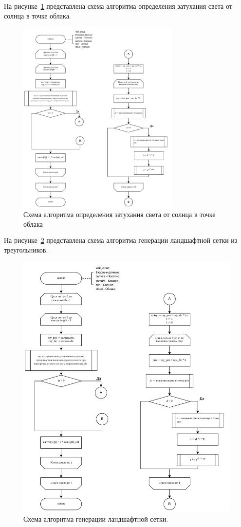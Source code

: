 \clearpage
На рисунке~\ref{fig:cloud_fc1} представлена схема алгоритма определения затухания света от солнца в точке облака.
\begin{figure}[ht!]
	\centering
	\includegraphics[width=0.72\textwidth, page=2]{assets/img/cloud_flowchart.pdf}   
	\caption{Схема алгоритма определения затухания света от солнца в точке облака}
	\label{fig:cloud_fc1}
\end{figure}
\clearpage
На рисунке~\ref{fig:cloud_fc2} представлена схема алгоритма генерации ландшафтной сетки из треугольников.
\begin{figure}[ht!]
	\centering
	\includegraphics[width=1.0\textwidth, page=3]{assets/img/cloud_flowchart.pdf}   
	\caption{Схема алгоритма генерации ландшафтной сетки.}
	\label{fig:cloud_fc2}
\end{figure}
